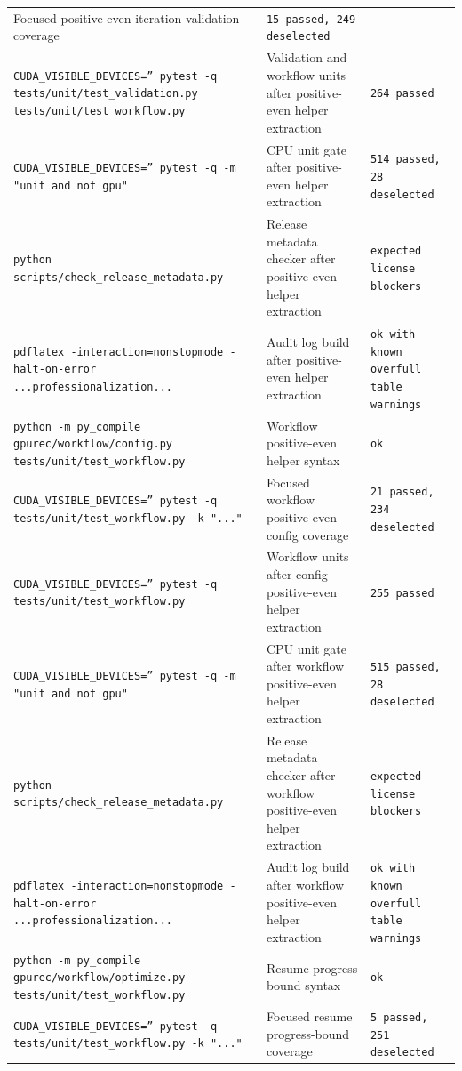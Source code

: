 \documentclass[11pt]{article}
\begin{document}
\begin{center}
\begin{tabular}{lll}
Focused positive-even iteration validation coverage &
\texttt{15 passed, 249 deselected} \\
\texttt{CUDA\_VISIBLE\_DEVICES='' pytest -q tests/unit/test\_validation.py tests/unit/test\_workflow.py} &
Validation and workflow units after positive-even helper extraction &
\texttt{264 passed} \\
\texttt{CUDA\_VISIBLE\_DEVICES='' pytest -q -m "unit and not gpu"} &
CPU unit gate after positive-even helper extraction &
\texttt{514 passed, 28 deselected} \\
\texttt{python scripts/check\_release\_metadata.py} &
Release metadata checker after positive-even helper extraction &
\texttt{expected license blockers} \\
\texttt{pdflatex -interaction=nonstopmode -halt-on-error ...professionalization...} &
Audit log build after positive-even helper extraction &
\texttt{ok with known overfull table warnings} \\
\texttt{python -m py\_compile gpurec/workflow/config.py tests/unit/test\_workflow.py} &
Workflow positive-even helper syntax &
\texttt{ok} \\
\texttt{CUDA\_VISIBLE\_DEVICES='' pytest -q tests/unit/test\_workflow.py -k "..."} &
Focused workflow positive-even config coverage &
\texttt{21 passed, 234 deselected} \\
\texttt{CUDA\_VISIBLE\_DEVICES='' pytest -q tests/unit/test\_workflow.py} &
Workflow units after config positive-even helper extraction &
\texttt{255 passed} \\
\texttt{CUDA\_VISIBLE\_DEVICES='' pytest -q -m "unit and not gpu"} &
CPU unit gate after workflow positive-even helper extraction &
\texttt{515 passed, 28 deselected} \\
\texttt{python scripts/check\_release\_metadata.py} &
Release metadata checker after workflow positive-even helper extraction &
\texttt{expected license blockers} \\
\texttt{pdflatex -interaction=nonstopmode -halt-on-error ...professionalization...} &
Audit log build after workflow positive-even helper extraction &
\texttt{ok with known overfull table warnings} \\
\texttt{python -m py\_compile gpurec/workflow/optimize.py tests/unit/test\_workflow.py} &
Resume progress bound syntax &
\texttt{ok} \\
\texttt{CUDA\_VISIBLE\_DEVICES='' pytest -q tests/unit/test\_workflow.py -k "..."} &
Focused resume progress-bound coverage &
\texttt{5 passed, 251 deselected} \\

\end{tabular}
\end{center}
\end{document}
